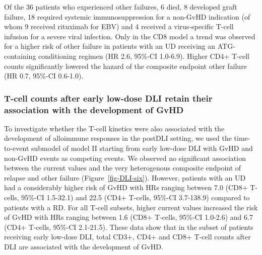 \documentclass[
  letterpaper,
  DIV=11,
  numbers=noendperiod]{scrreprt}
\begin{document}
Of the 36 patients who experienced other failures, 6 died, 8 developed
graft failure, 18 required systemic immunosuppression for a non-GvHD
indication (of whom 9 received rituximab for EBV) and 4 received a
virus-specific T-cell infusion for a severe viral infection. Only in the
CD8 model a trend was observed for a higher risk of other failure in
patients with an UD receiving an ATG-containing conditioning regimen (HR
2.6, 95\%-CI 1.0-6.9). Higher CD4+ T-cell counts significantly lowered
the hazard of the composite endpoint other failure (HR 0.7, 95\%-CI
0.6-1.0).

\subsubsection{T-cell counts after early low-dose DLI retain their
association with the development of
GvHD}\label{t-cell-counts-after-early-low-dose-dli-retain-their-association-with-the-development-of-gvhd}

To investigate whether the T-cell kinetics were also associated with the
development of alloimmune responses in the postDLI setting, we used the
time-to-event submodel of model II starting from early low-dose DLI with
GvHD and non-GvHD events as competing events. We observed no significant
association between the current values and the very heterogenous
composite endpoint of relapse and other failure
(Figure~\ref{fig-DLI-six}). However, patients with an UD had a
considerably higher risk of GvHD with HRs ranging between 7.0 (CD8+
T-cells, 95\%-CI 1.5-32.1) and 22.5 (CD4+ T-cells, 95\%-CI 3.7-138.9)
compared to patients with a RD. For all T-cell subsets, higher current
values increased the risk of GvHD with HRs ranging between 1.6 (CD8+
T-cells, 95\%-CI 1.0-2.6) and 6.7 (CD4+ T-cells, 95\%-CI 2.1-21.5).
These data show that in the subset of patients receiving early low-dose
DLI, total CD3+, CD4+ and CD8+ T-cell counts after DLI are associated
with the development of GvHD.
\end{document}
